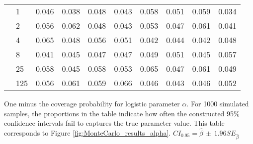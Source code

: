 \documentclass[12pt]{article}
\theoremstyle{definition}
\begin{document}
\begin{table}[b!]
\begin{threeparttable}
{\begin{tabular}[r]{l l r r r r r r r r}
          &    1 & 0.046 & 0.038 & 0.048 & 0.043 & 0.058 & 0.051 & 0.059 & 0.034 \\
          &    2 & 0.056 & 0.062 & 0.048 & 0.043 & 0.053 & 0.047 & 0.061 & 0.041 \\
          &    4 & 0.065 & 0.048 & 0.056 & 0.051 & 0.042 & 0.044 & 0.042 & 0.048 \\
          &    8 & 0.041 & 0.045 & 0.047 & 0.047 & 0.049 & 0.051 & 0.045 & 0.057 \\
          &   25 & 0.058 & 0.045 & 0.058 & 0.053 & 0.065 & 0.047 & 0.061 & 0.049 \\
          &  125 & 0.056 & 0.061 & 0.059 & 0.066 & 0.046 & 0.043 & 0.046 & 0.052 \\
  \hline
    \end{tabular}
    }
    \begin{tablenotes}
      \item{\footnotesize One minus the coverage probability for logistic parameter $\alpha$. For 1000 simulated samples, the proportions in the table indicate how often the constructed 95\% confidence intervals fail to captures the true parameter value. This table corresponds to Figure \ref{fig:MonteCarlo_results_alpha}. $CI_{0.95} = \hat\beta \, \pm \, 1.96 SE_{\hat{\beta}}$}
    \end{tablenotes} \label{tbl:coverage_ratio_alpha}
  \end{threeparttable}
\end{table}
\end{document}
